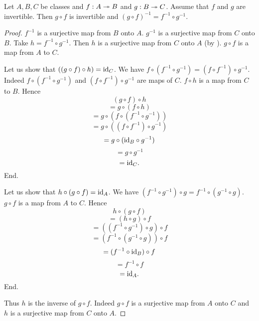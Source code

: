 \documentclass[10pt]{article}
\begin{document}
  \begin{forthel}
    \begin{proposition}[id=FOUNDATIONS_09_7619151963095040,printid]
      Let $A, B, C$ be classes and $f : A \twoheadrightarrow B$ and $g : B \twoheadrightarrow C$.
      Assume that $f$ and $g$ are invertible.
      Then $g \circ f$ is invertible and $(g \circ f)^{-1} = f^{-1} \circ g^{-1}$.
    \end{proposition}
    \begin{proof}
      $f^{-1}$ is a surjective map from $B$ onto $A$.
      $g^{-1}$ is a surjective map from $C$ onto $B$.
      Take $h = f^{-1} \circ g^{-1}$.
      Then $h$ is a surjective map from $C$ onto $A$ (by ).
      $g \circ f$ is a map from $A$ to $C$.

      Let us show that $((g \circ f) \circ h) = \textrm{id}_{C}$.
        We have $f \circ (f^{-1} \circ g^{-1}) = (f \circ f^{-1}) \circ g^{-1}$.
        Indeed $f \circ (f^{-1} \circ g^{-1})$ and $(f \circ f^{-1}) \circ g^{-1}$ are maps of $C$.
        $f \circ h$ is a map from $C$ to $B$.
        Hence
        \[  (g \circ f) \circ h                           \]
        \[    = g \circ (f \circ h)                       \]
        \[    = g \circ (f \circ (f^{-1} \circ g^{-1}))   \]
        \[    = g \circ ((f \circ f^{-1}) \circ g^{-1})   \]
        \[    = g \circ (\textrm{id}_{B} \circ g^{-1})            \]
        \[    = g \circ g^{-1}                            \]
        \[    = \textrm{id}_{C}.                                  \]
      End.

      Let us show that $h \circ (g \circ f) = \textrm{id}_{A}$.
        We have $(f^{-1} \circ g^{-1}) \circ g = f^{-1} \circ (g^{-1} \circ g)$.
        $g \circ f$ is a map from $A$ to $C$.
        Hence
        \[  h \circ (g \circ f)                           \]
        \[    = (h \circ g) \circ f                       \]
        \[    = ((f^{-1} \circ g^{-1}) \circ g) \circ f   \]
        \[    = (f^{-1} \circ (g^{-1} \circ g)) \circ f   \]
        \[    = (f^{-1} \circ \textrm{id}_{B}) \circ f            \]
        \[    = f^{-1} \circ f                            \]
        \[    = \textrm{id}_{A}.                                  \]
      End.

      Thus $h$ is the inverse of $g \circ f$.
      Indeed $g \circ f$ is a surjective map from $A$ onto $C$ and $h$ is a surjective map from $C$ onto $A$.
    \end{proof}
  \end{forthel}
\end{document}
